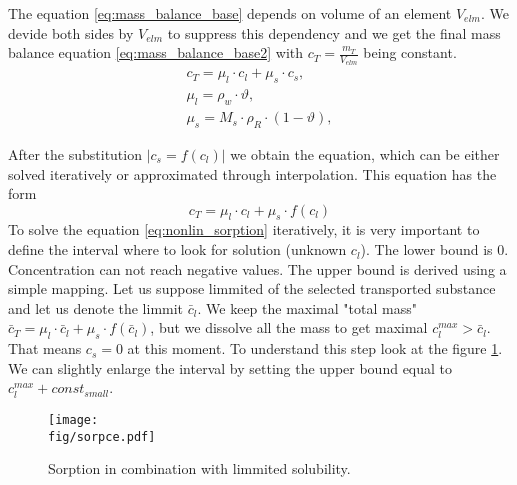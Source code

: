 The equation \eqref{eq:mass_balance_base} depends on volume of an element $V_{elm}$. We devide both sides 
by $V_{elm}$ to suppress this dependency and we get the final mass balance equation \eqref{eq:mass_balance_base2} 
with $c_T = \frac{m_T}{V_{elm}}$ being constant.
\begin{equation}
 \begin{array}{l}
  c_T = \mu_l\cdot c_l + \mu_s\cdot c_s, \\
  \mu_l = \rho_w\cdot \vartheta, \\
  \mu_s = M_s \cdot\rho_R\cdot(1-\vartheta),
 \end{array}
 \label{eq:mass_balance_base2}
\end{equation}

After the substitution $|c_s = f(c_l)|$ we obtain the equation, which can be either solved iteratively 
or approximated through interpolation. This equation has the form
\begin{equation}
 c_T = \mu_l\cdot c_l + \mu_s\cdot f(c_l)
 \label{eq:nonlin_sorption}
\end{equation}
To solve the equation \eqref{eq:nonlin_sorption} iteratively, it is very important to define the interval where 
to look for solution (unknown $c_l$). The lower bound is $0$. Concentration can not reach negative values. 
The upper bound is derived using a simple mapping. Let us suppose limmited 
 of the selected transported substance and let us denote the 
limmit $\bar{c}_l$. We keep the maximal "total mass" 
$\bar{c}_T= \mu_l\cdot \bar{c}_l + \mu_s\cdot f(\bar{c}_l)$, but we dissolve all the mass to get 
maximal $c_l^{max} > \bar{c}_l$. That means $c_s = 0$ at this moment. To understand this step look at 
the figure \ref{fig:sorpce}. We can slightly enlarge the interval by setting the upper bound equal to 
$c_l^{max} + const_{small}$.

\begin{figure}[ht!]
 \centering
 \texttt{[image: \\fig/sorpce.pdf]}
 \caption{Sorption in combination with limmited solubility.}
 \label{fig:sorpce}
\end{figure}


